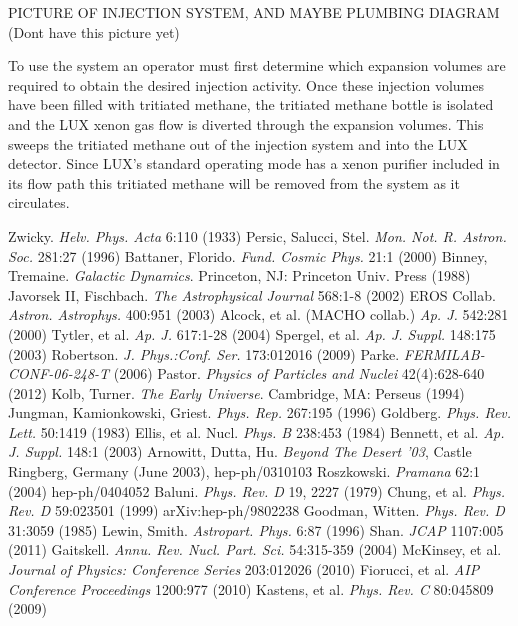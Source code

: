 \documentclass[a4paper,12pt]{article}
\begin{document}
PICTURE OF INJECTION SYSTEM, AND MAYBE PLUMBING DIAGRAM (Dont have this picture yet)

To use the system an operator must first determine which expansion volumes are required to obtain the desired injection activity.  Once these injection volumes have been filled with tritiated methane, the tritiated methane bottle is isolated and the LUX xenon gas flow is diverted through the expansion volumes.  This sweeps the tritiated methane out of the injection system and into the LUX detector.  Since LUX's standard operating mode has a xenon purifier included in its flow path this tritiated methane will be removed from the system as it circulates. 

\begin{thebibliography}{1}

 Zwicky.  \emph{Helv. Phys. Acta} 6:110 (1933)
 Persic, Salucci, Stel.  \emph{Mon. Not. R. Astron. Soc.} 281:27 (1996)
 Battaner, Florido.  \emph{Fund. Cosmic Phys.} 21:1 (2000)
 Binney, Tremaine. \emph{Galactic Dynamics}. Princeton, NJ: Princeton Univ. Press (1988)
 Javorsek II, Fischbach. \emph{The Astrophysical Journal} 568:1-8 (2002)
 EROS Collab.  \emph{Astron. Astrophys.} 400:951 (2003)
 Alcock, et al. (MACHO collab.)  \emph{Ap. J.} 542:281 (2000)
 Tytler, et al. \emph{Ap. J.} 617:1-28 (2004)
 Spergel, et al. \emph{Ap. J. Suppl.} 148:175 (2003)
 Robertson. \emph{J. Phys.:Conf. Ser.} 173:012016 (2009)
 Parke.  \emph{FERMILAB-CONF-06-248-T} (2006)
 Pastor.  \emph{Physics of Particles and Nuclei} 42(4):628-640 (2012)
 Kolb, Turner. \emph{The Early Universe}.  Cambridge, MA: Perseus (1994)
 Jungman, Kamionkowski, Griest.  \emph{Phys. Rep.} 267:195 (1996)
 Goldberg.  \emph{Phys. Rev. Lett.} 50:1419 (1983)
 Ellis, et al. Nucl. \emph{Phys. B} 238:453 (1984)
 Bennett, et al. \emph{Ap. J. Suppl.} 148:1 (2003)
 Arnowitt, Dutta, Hu. \emph{Beyond The Desert '03}, Castle Ringberg, Germany (June 2003), hep-ph/0310103
 Roszkowski.  \emph{Pramana} 62:1 (2004) hep-ph/0404052
 Baluni. \emph{Phys. Rev. D} 19, 2227 (1979)
 Chung, et al.  \emph{Phys. Rev. D} 59:023501 (1999) arXiv:hep-ph/9802238
 Goodman, Witten. \emph{Phys. Rev. D} 31:3059 (1985)
 Lewin, Smith. \emph{Astropart. Phys.} 6:87 (1996)
 Shan. \emph{JCAP} 1107:005 (2011)
 Gaitskell.  \emph{Annu. Rev. Nucl. Part. Sci.} 54:315-359 (2004)
 McKinsey, et al.  \emph{Journal of Physics: Conference Series} 203:012026 (2010) 
 Fiorucci, et al.  \emph{AIP Conference Proceedings} 1200:977 (2010)
 Kastens, et al. \emph{Phys. Rev. C} 80:045809 (2009)


\end{thebibliography}
\end{document}
